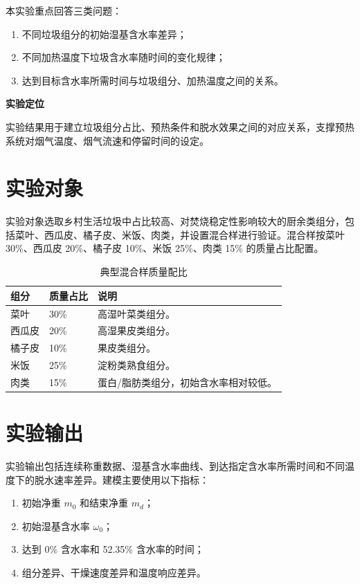 \documentclass[UTF8,openany,zihao=-4,oneside]{ctexbook}
\newcommand{\notebox}[2]{\begin{tcolorbox}[enhanced,colback=FGBlue!4,colframe=FGBlue!45,boxrule=0.5pt,arc=1.5mm,left=4mm,right=4mm,top=3mm,bottom=3mm]\sffamily\textbf{\color{FGDeep}#1}\par\vspace{0.25em}\color{FGText}#2\end{tcolorbox}}
\begin{document}
本实验重点回答三类问题：
\begin{enumerate}
\item 不同垃圾组分的初始湿基含水率差异；
\item 不同加热温度下垃圾含水率随时间的变化规律；
\item 达到目标含水率所需时间与垃圾组分、加热温度之间的关系。
\end{enumerate}

\notebox{实验定位}{实验结果用于建立垃圾组分占比、预热条件和脱水效果之间的对应关系，支撑预热系统对烟气温度、烟气流速和停留时间的设定。}

\section{实验对象}

实验对象选取乡村生活垃圾中占比较高、对焚烧稳定性影响较大的厨余类组分，包括菜叶、西瓜皮、橘子皮、米饭、肉类，并设置混合样进行验证。混合样按菜叶 30\%、西瓜皮 20\%、橘子皮 10\%、米饭 25\%、肉类 15\% 的质量占比配置。

\begin{table}[htbp]
\centering
\begin{tabularx}{0.86\textwidth}{p{30mm}p{28mm}X}
\toprule
组分 & 质量占比 & 说明 \\
\midrule
菜叶 & 30\% & 高湿叶菜类组分。\\
西瓜皮 & 20\% & 高湿果皮类组分。\\
橘子皮 & 10\% & 果皮类组分。\\
米饭 & 25\% & 淀粉类熟食组分。\\
肉类 & 15\% & 蛋白/脂肪类组分，初始含水率相对较低。\\
\bottomrule
\end{tabularx}
\caption{典型混合样质量配比}
\label{tab:mix-ratio}
\end{table}

\section{实验输出}

实验输出包括连续称重数据、湿基含水率曲线、到达指定含水率所需时间和不同温度下的脱水速率差异。建模主要使用以下指标：
\begin{enumerate}
\item 初始净重 $m_0$ 和结束净重 $m_d$；
\item 初始湿基含水率 $\omega_0$；
\item 达到 0\% 含水率和 52.35\% 含水率的时间；
\item 组分差异、干燥速度差异和温度响应差异。
\end{enumerate}
\end{document}
